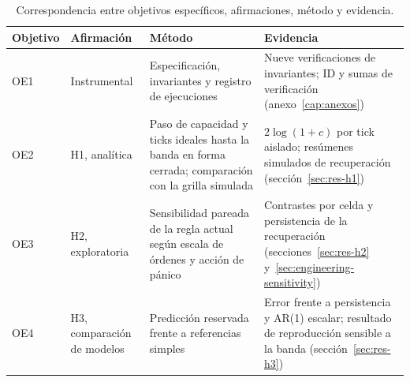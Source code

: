 \begin{table}[H]
\centering
\caption{Correspondencia entre objetivos específicos, afirmaciones, método y evidencia.}
\label{tab:oe-h}
\footnotesize
\setlength{\tabcolsep}{3pt}
\renewcommand{\arraystretch}{1.0}
\begin{tabularx}{\textwidth}{@{}l l >{\raggedright\arraybackslash}X >{\raggedright\arraybackslash}X@{}}
\toprule
Objetivo & Afirmación & Método & Evidencia \\
\midrule
OE1 & Instrumental & Especificación, invariantes y registro de ejecuciones & Nueve verificaciones de invariantes; ID y sumas de verificación (anexo~\ref{cap:anexos}) \\
OE2 & H1, analítica & Paso de capacidad y ticks ideales hasta la banda en forma cerrada; comparación con la grilla simulada & $2\log(1+c)$ por tick aislado; resúmenes simulados de recuperación (sección~\ref{sec:res-h1}) \\
OE3 & H2, exploratoria & Sensibilidad pareada de la regla actual según escala de órdenes y acción de pánico & Contrastes por celda y persistencia de la recuperación (secciones~\ref{sec:res-h2} y~\ref{sec:engineering-sensitivity}) \\
OE4 & H3, comparación de modelos & Predicción reservada frente a referencias simples & Error frente a persistencia y AR(1) escalar; resultado de reproducción sensible a la banda (sección~\ref{sec:res-h3}) \\
\bottomrule
\end{tabularx}
\end{table}
